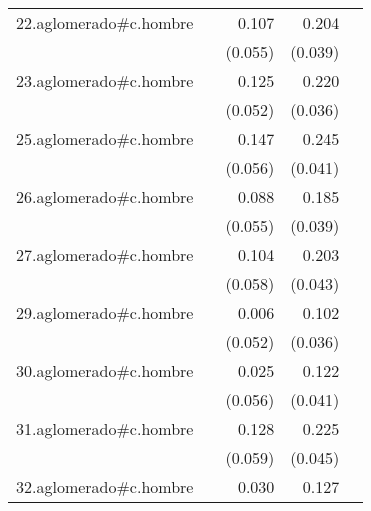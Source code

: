 {\begin{longtable}{l*{4}{D{.}{.}{-1}}}
\addlinespace
22.aglomerado#c.hombre&                     &       0.107         &       0.204\sym{***}&                     \\
            &                     &     (0.055)         &     (0.039)         &                     \\
\addlinespace
23.aglomerado#c.hombre&                     &       0.125\sym{*}  &       0.220\sym{***}&                     \\
            &                     &     (0.052)         &     (0.036)         &                     \\
\addlinespace
25.aglomerado#c.hombre&                     &       0.147\sym{**} &       0.245\sym{***}&                     \\
            &                     &     (0.056)         &     (0.041)         &                     \\
\addlinespace
26.aglomerado#c.hombre&                     &       0.088         &       0.185\sym{***}&                     \\
            &                     &     (0.055)         &     (0.039)         &                     \\
\addlinespace
27.aglomerado#c.hombre&                     &       0.104         &       0.203\sym{***}&                     \\
            &                     &     (0.058)         &     (0.043)         &                     \\
\addlinespace
29.aglomerado#c.hombre&                     &       0.006         &       0.102\sym{**} &                     \\
            &                     &     (0.052)         &     (0.036)         &                     \\
\addlinespace
30.aglomerado#c.hombre&                     &       0.025         &       0.122\sym{**} &                     \\
            &                     &     (0.056)         &     (0.041)         &                     \\
\addlinespace
31.aglomerado#c.hombre&                     &       0.128\sym{*}  &       0.225\sym{***}&                     \\
            &                     &     (0.059)         &     (0.045)         &                     \\
\addlinespace
32.aglomerado#c.hombre&                     &       0.030         &       0.127\sym{***}&                     \\

\end{longtable}}
